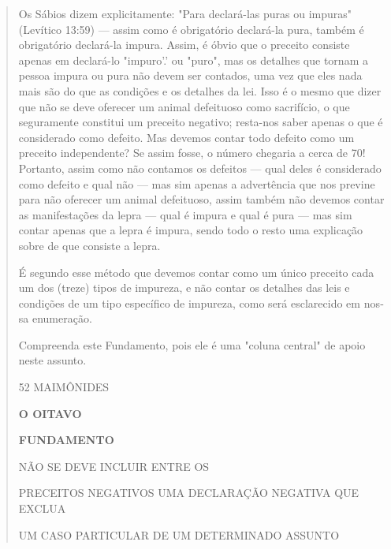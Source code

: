 \begin{quote}
Os Sábios dizem explicitamente: "Para declará-las puras ou impuras"
(Levítico 13:59) --- assim como é obrigatório declará-la pura, também é
obriga­tório declará-la impura. Assim, é óbvio que o preceito consiste
apenas em declará-lo "impuro'.' ou "puro", mas os detalhes que tornam a
pessoa impura ou pura não devem ser contados, uma vez que eles nada mais
são do que as condições e os detalhes da lei. Isso é o mesmo que dizer
que não se deve ofere­cer um animal defeituoso como sacrifício, o que
seguramente constitui um pre­ceito negativo; resta-nos saber apenas o
que é considerado como defeito. Mas devemos contar todo defeito como um
preceito independente? Se assim fosse, o número chegaria a cerca de 70!
Portanto, assim como não contamos os defei­tos --- qual deles é
considerado como defeito e qual não --- mas sim apenas a advertência que
nos previne para não oferecer um animal defeituoso, assim tam­bém não
devemos contar as manifestações da lepra --- qual é impura e qual é pura
--- mas sim contar apenas que a lepra é impura, sendo todo o resto uma
explicação sobre de que consiste a lepra.

É segundo esse método que devemos contar como um único pre­ceito cada um
dos (treze) tipos de impureza, e não contar os detalhes das leis e
condições de um tipo específico de impureza, como será esclarecido em
nos­sa enumeração.

Compreenda este Fundamento, pois ele é uma "coluna central" de apoio
neste assunto.

52 MAIMÔNIDES

\textbf{O OITAVO}

\textbf{FUNDAMENTO}

NÃO SE DEVE INCLUIR ENTRE OS

PRECEITOS NEGATIVOS UMA DECLARAÇÃO NEGATIVA QUE EXCLUA

UM CASO PARTICULAR DE UM DETERMINADO ASSUNTO


\end{quote}
